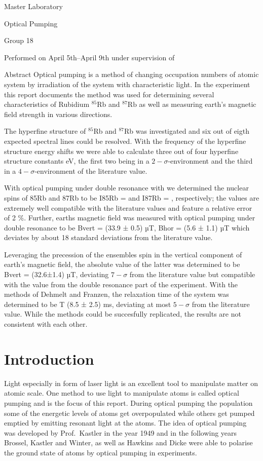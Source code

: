 \documentclass{article}
\begin{document}
Master Laboratory

Optical Pumping

Group 18

Performed on April 5th–April 9th
under supervision of

Abstract
Optical pumping is a method of changing occupation numbers of atomic
system by irradiation of the system with characteristic light. In
the experiment this report documents the method was used for
determining several characteristics of Rubidium $^{85}$Rb and
$^{87}\text{Rb}$ as well as measuring earth’s magnetic field strength in
various directions.

The hyperfine structure of $^{85}$Rb and $^{87}$Rb was investigated
and six out of eigth expected spectral lines could be resolved.
With the frequency of the hyperfine structure energy shifts we were
able to calculate three out of four hyperfine structure constants
eV, the first two being in a $2-\sigma$-environment
and the third in a $4-\sigma$-environment of the literature value.

With optical pumping under double resonance with we determined the
nuclear spins of 85Rb and 87Rb to be I85Rb = and I87Rb = ,
respectively; the values are extremely well compatible with the
literature values and feature a relative error of  2 \%. 
Further, earths magnetic field was measured with optical
pumping under double resonance to be Bvert = (33.9 ± 0.5) µT, 
Bhor = (5.6 ± 1.1) µT which deviates by about 18 standard deviations
from the literature value.

Leveraging the precession of the ensembles spin in the vertical
component of earth’s magnetic field, the absolute value of the
latter was determined to be Bvert = (32.6±1.4) µT, deviating 
$7-\sigma$ from the literature value but compatible with the value
from the double resonance part of the experiment.
With the methods of Dehmelt and Franzen, the relaxation time of the
system was determined to be T
(8.5 ± 2.5) ms, deviating at most $5-\sigma$ from the literature
value. While the methods could be succesfully replicated,
the results are not consistent with each other.

\tableofcontents

\section{Introduction}

\label{sec: intro}
Light especially in form of laser light is an excellent tool to
manipulate matter on atomic scale. One method to use light to
manipulate atoms is called optical pumping and is the focus of this
report. During optical pumping the population some of the energetic
levels of atoms get overpopulated while others get pumped emptied by
emitting resonant light at the atoms. The idea of optical pumping was
developed by Prof.\ Kastler in the year 1949 and in the following
years Brossel, Kastler and Winter, as well as Hawkins and Dicke were
able to polarise the ground state of atoms by optical pumping in
experiments.
\end{document}
